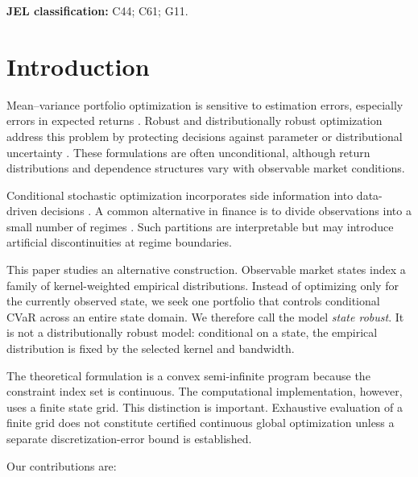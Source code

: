 \documentclass[11pt,a4paper]{article}
\theoremstyle{definition}
\theoremstyle{remark}
\begin{document}
\noindent\textbf{JEL classification:}
C44; C61; G11.

\section{Introduction}

Mean--variance portfolio optimization is sensitive to estimation errors,
especially errors in expected returns
\citep{markowitz1952portfolio,goldfarb2003robust}.
Robust and distributionally robust optimization address this problem by
protecting decisions against parameter or distributional uncertainty
\citep{delage2010distributionally,esfahani2018data}.
These formulations are often unconditional, although return distributions
and dependence structures vary with observable market conditions.

Conditional stochastic optimization incorporates side information into
data-driven decisions
\citep{bertsimas2020predictive,esteban2022distributionally,
nguyen2025robustifying}.
A common alternative in finance is to divide observations into a small
number of regimes \citep{ang2002international}. Such partitions are
interpretable but may introduce artificial discontinuities at regime
boundaries.

This paper studies an alternative construction. Observable market states
index a family of kernel-weighted empirical distributions. Instead of
optimizing only for the currently observed state, we seek one portfolio that
controls conditional CVaR across an entire state domain. We therefore call
the model \emph{state robust}. It is not a distributionally robust model:
conditional on a state, the empirical distribution is fixed by the selected
kernel and bandwidth.

The theoretical formulation is a convex semi-infinite program because the
constraint index set is continuous. The computational implementation,
however, uses a finite state grid. This distinction is important. Exhaustive
evaluation of a finite grid does not constitute certified continuous global
optimization unless a separate discretization-error bound is established.

Our contributions are:
\end{document}
